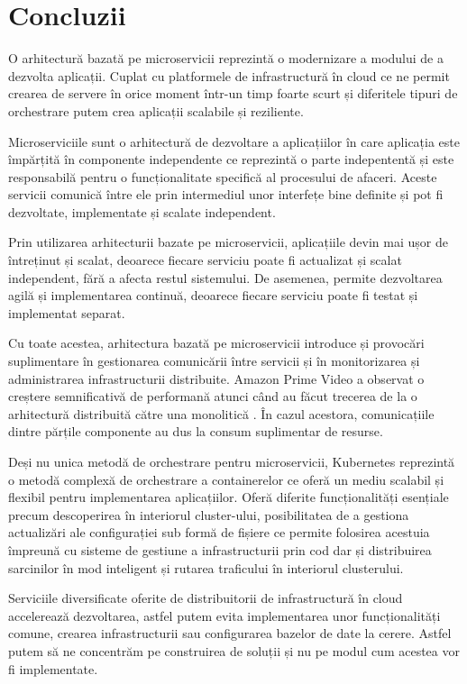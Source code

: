 \chapter{Concluzii}

O arhitectură bazată pe microservicii reprezintă o modernizare a modului de a dezvolta aplicații.
Cuplat cu platformele de infrastructură în cloud ce ne permit crearea de servere
în orice moment într-un timp foarte scurt și diferitele tipuri de orchestrare
putem crea aplicații scalabile și reziliente.

Microserviciile sunt o arhitectură de dezvoltare a aplicațiilor în care aplicația este
împărțită în componente independente ce reprezintă o parte indepententă și este responsabilă pentru o
funcționalitate specifică al procesului de afaceri. Aceste servicii comunică între
ele prin intermediul unor interfețe bine definite și pot fi dezvoltate, implementate și scalate independent.

Prin utilizarea arhitecturii bazate pe microservicii,
aplicațiile devin mai ușor de întreținut și scalat,
deoarece fiecare serviciu poate fi actualizat și scalat independent,
fără a afecta restul sistemului.
De asemenea, permite dezvoltarea agilă și
implementarea continuă, deoarece fiecare serviciu poate
fi testat și implementat separat.

Cu toate acestea, arhitectura bazată pe microservicii
introduce și provocări suplimentare în gestionarea
comunicării între servicii și în monitorizarea și
administrarea infrastructurii distribuite. Amazon Prime Video a observat
o creștere semnificativă de performană atunci când au făcut trecerea de la o arhitectură
distribuită către una monolitică \cite{Kolny_2023}. În cazul acestora, comunicațiile
dintre părțile componente au dus la consum suplimentar de resurse.

Deși nu unica metodă de orchestrare pentru microservicii, Kubernetes reprezintă o metodă complexă de orchestrare a containerelor ce oferă
un mediu scalabil și flexibil pentru implementarea aplicațiilor. Oferă diferite
funcționalități esențiale precum descoperirea în interiorul cluster-ului,
posibilitatea de a gestiona actualizări ale configurației sub formă de fișiere ce permite folosirea
acestuia împreună cu sisteme de gestiune a infrastructurii prin cod dar și
distribuirea sarcinilor în mod inteligent și rutarea traficului în interiorul clusterului.

Serviciile diversificate oferite de distribuitorii de infrastructură în cloud
accelerează dezvoltarea, astfel putem evita implementarea
unor funcționalități comune, crearea infrastructurii sau configurarea bazelor de
date la cerere. Astfel putem să ne concentrăm pe construirea de soluții și nu pe modul
cum acestea vor fi implementate.

